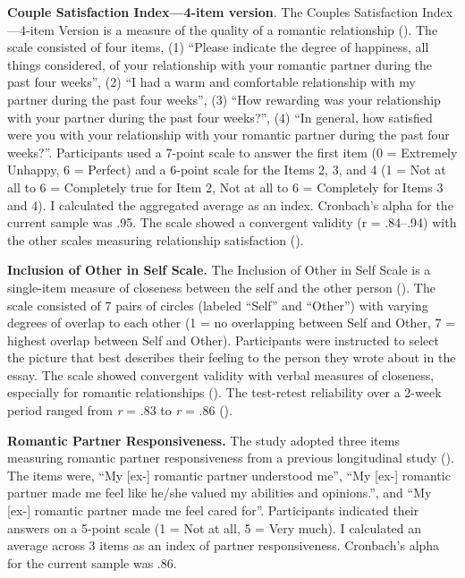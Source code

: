 \documentclass[
]{udthesis}
\begin{document}
\textbf{Couple Satisfaction Index---4-item version}. The Couples Satisfaction Index---4-item Version is a measure of the quality of a romantic relationship (). The scale consisted of four items, (1) ``Please indicate the degree of happiness, all things considered, of your relationship with your romantic partner during the past four weeks'', (2) ``I had a warm and comfortable relationship with my partner during the past four weeks'', (3) ``How rewarding was your relationship with your partner during the past four weeks?'', (4) ``In general, how satisfied were you with your relationship with your romantic partner during the past four weeks?''. Participants used a 7-point scale to answer the first item (0 = Extremely Unhappy, 6 = Perfect) and a 6-point scale for the Items 2, 3, and 4 (1 = Not at all to 6 = Completely true for Item 2, Not at all to 6 = Completely for Items 3 and 4). I calculated the aggregated average as an index. Cronbach's alpha for the current sample was .95. The scale showed a convergent validity (r = .84--.94) with the other scales measuring relationship satisfaction ().

\textbf{Inclusion of Other in Self Scale.} The Inclusion of Other in Self Scale is a single-item measure of closeness between the self and the other person (). The scale consisted of 7 pairs of circles (labeled ``Self'' and ``Other'') with varying degrees of overlap to each other (1 = no overlapping between Self and Other, 7 = highest overlap between Self and Other). Participants were instructed to select the picture that best describes their feeling to the person they wrote about in the essay. The scale showed convergent validity with verbal measures of closeness, especially for romantic relationships (). The test-retest reliability over a 2-week period ranged from \emph{r} = .83 to \emph{r} = .86 ().

\textbf{Romantic Partner Responsiveness.} The study adopted three items measuring romantic partner responsiveness from a previous longitudinal study (). The items were, ``My {[}ex-{]} romantic partner understood me'', ``My {[}ex-{]} romantic partner made me feel like he/she valued my abilities and opinions.'', and ``My {[}ex-{]} romantic partner made me feel cared for''. Participants indicated their answers on a 5-point scale (1 = Not at all, 5 = Very much). I calculated an average across 3 items as an index of partner responsiveness. Cronbach's alpha for the current sample was .86.
\end{document}
